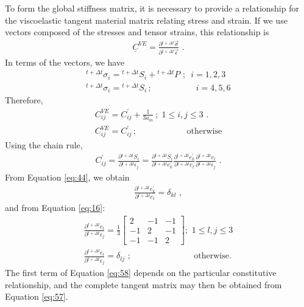 To form the global stiffness matrix, it is necessary to provide a
relationship for the viscoelastic tangent material matrix relating
stress and strain. If we use vectors composed of the stresses and
tensor strains, this relationship is
\begin{gather}
\underline{C}^{VE}=\frac{\partial\phantom{}^{t+\Delta t}\overrightarrow{\sigma}}{\partial\phantom{}^{t+\Delta t}\overrightarrow{\epsilon}}\,\,.\label{eq:55}
\end{gather}
In terms of the vectors, we have
\begin{gather}
^{t+\Delta t}\sigma_{i}=\phantom{}^{t+\Delta t}S_{i}+\phantom{}^{t+\Delta t}P\,\,;\,\,\, i=1,2,3\label{eq:56}\\
^{t+\Delta t}\sigma_{i}=\phantom{}^{t+\Delta t}S_{i}\,;\,\,\,\,\,\,\,\,\,\,\,\,\,\,\,\,\,\,\,\,\,\,\,\,\,\,\,\,\,\,\, i=4,5,6\nonumber 
\end{gather}
Therefore,
\begin{gather}
C_{ij}^{VE}=C_{ij}^{\prime}+\frac{1}{3a_{m}}\,;\,\,1\leq i,j\leq3\,\,.\label{eq:57}\\
C_{ij}^{VE}=C_{ij}^{\prime}\,;\,\,\,\,\,\,\,\,\,\,\,\,\,\,\,\,\,\,\,\,\,\,\,\,\,\,\,\,\,\,\,\,\,\,\,\textrm{otherwise}\nonumber 
\end{gather}
Using the chain rule,
\begin{gather}
C_{ij}^{\prime}=\frac{\partial\phantom{}^{t+\Delta t}S_{i}}{\partial\phantom{}^{t+\Delta t}\epsilon_{j}}=\frac{\partial\phantom{}^{t+\Delta t}S_{i}}{\partial\phantom{}^{t+\Delta t}e_{k}^{\prime}}\frac{\partial\phantom{}^{t+\Delta t}e_{k}^{\prime}}{\partial\phantom{}^{t+\Delta t}e_{l}}\frac{\partial\phantom{}^{t+\Delta t}e_{l}}{\partial\phantom{}^{t+\Delta t}\epsilon_{j}}\,\,.\label{eq:58}
\end{gather}
From Equation \ref{eq:44}, we obtain
\begin{gather}
\frac{\partial\phantom{}^{t+\Delta t}e_{k}^{\prime}}{\partial\phantom{}^{t+\Delta t}e_{l}}=\delta_{kl}\,\,,\label{eq:59}
\end{gather}
and from Equation \ref{eq:16}:
\begin{gather}
\frac{\partial\phantom{}^{t+\Delta t}e_{l}}{\partial\phantom{}^{t+\Delta t}\epsilon_{j}}=\frac{1}{3}\left[\begin{array}{ccc}
2 & -1 & -1\\
-1 & 2 & -1\\
-1 & -1 & 2
\end{array}\right];\,\,1\leq l,j\leq3\label{eq:60}\\
\frac{\partial\phantom{}^{t+\Delta t}e_{l}}{\partial\phantom{}^{t+\Delta t}\epsilon_{j}}=\delta_{lj}\,\,;\,\,\,\,\,\,\,\,\,\,\,\,\,\,\,\,\,\,\,\,\,\,\,\,\,\,\,\,\,\,\,\,\,\,\,\,\,\,\,\,\,\,\,\,\textrm{otherwise.}\nonumber 
\end{gather}
The first term of Equation \ref{eq:58} depends on the particular
constitutive relationship, and the complete tangent matrix may then
be obtained from Equation \ref{eq:57}.


